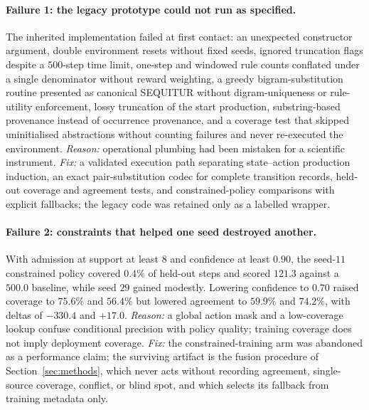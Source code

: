 \documentclass[11pt,a4paper]{article}
\theoremstyle{definition}
\begin{document}
\paragraph{Failure 1: the legacy prototype could not run as specified.}
The inherited implementation failed at first contact: an unexpected
constructor argument, double environment resets without fixed seeds, ignored
truncation flags despite a $500$-step time limit, one-step and windowed rule
counts conflated under a single denominator without reward weighting, a
greedy bigram-substitution routine presented as canonical SEQUITUR without
digram-uniqueness or rule-utility enforcement, lossy truncation of the start
production, substring-based provenance instead of occurrence provenance, and a
coverage test that skipped uninitialised abstractions without counting
failures and never re-executed the environment. \emph{Reason:} operational
plumbing had been mistaken for a scientific instrument. \emph{Fix:} a
validated execution path separating state--action production induction, an
exact pair-substitution codec for complete transition records, held-out
coverage and agreement tests, and constrained-policy comparisons with
explicit fallbacks; the legacy code was retained only as a labelled wrapper.

\paragraph{Failure 2: constraints that helped one seed destroyed another.}
With admission at support at least $8$ and confidence at least $0.90$, the
seed-$11$ constrained policy covered $0.4\%$ of held-out steps and scored
$121.3$ against a $500.0$ baseline, while seed $29$ gained modestly. Lowering
confidence to $0.70$ raised coverage to $75.6\%$ and $56.4\%$ but lowered
agreement to $59.9\%$ and $74.2\%$, with deltas of $-330.4$ and $+17.0$.
\emph{Reason:} a global action mask and a low-coverage lookup confuse
conditional precision with policy quality; training coverage does not imply
deployment coverage. \emph{Fix:} the constrained-training arm was abandoned
as a performance claim; the surviving artifact is the fusion procedure of
Section~\ref{sec:methods}, which never acts without recording agreement,
single-source coverage, conflict, or blind spot, and which selects its
fallback from training metadata only.
\end{document}
